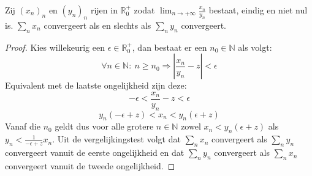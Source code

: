 \documentclass[main.tex]{subfiles}
\begin{document}
\begin{st}
  Zij $(x_{n})_{n}$ en $(y_{n})_{n}$ rijen in $\mathbb{R}_{0}^{+}$ zodat $\lim_{n\rightarrow +\infty}\frac{x_{n}}{y_{n}}$ bestaat, eindig en niet nul is.
  $\sum_{n}x_{n}$ convergeert als en slechts als $\sum_{n}y_{n}$ convergeert.

  \begin{proof}
    Kies willekeurig een $\epsilon \in \mathbb{R}_{0}^{+}$, dan bestaat er een $n_{0} \in \mathbb{N}$ als volgt:
    \[ \forall n\in \mathbb{N}:\ n \ge n_{0} \Rightarrow \left|\frac{x_{n}}{y_{n}} - z\right| < \epsilon \]
    Equivalent met de laatste ongelijkheid zijn deze:
    \[ -\epsilon < \frac{x_{n}}{y_{n}} - z < \epsilon \]
    \[ y_{n}(-\epsilon + z) < x_{n} < y_{n}(\epsilon + z) \]
    Vanaf die $n_{0}$ geldt dus voor alle grotere $n\in \mathbb{N}$ zowel $x_{n}< y_{n}(\epsilon + z)$ als $y_{n}< \frac{1}{-\epsilon+z}x_{n}$.
    Uit de vergelijkingstest volgt dat $\sum_{n}x_{n}$ convergeert als $\sum_{n}y_{n}$ convergeert vanuit de eerste ongelijkheid en dat $\sum_{n}y_{n}$ convergeert als $\sum_{n}x_{n}$ convergeert vanuit de tweede ongelijkheid.
  \end{proof}
\end{st}
\end{document}

